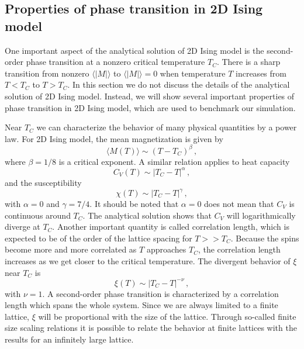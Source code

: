 \subsection{Properties of phase transition in 2D Ising model}\label{sec:transition}
One important aspect of the analytical solution of 2D Ising model is the second-order phase transition 
at a nonzero critical temperature $T_C$. 
There is a sharp transition from nonzero $\langle|M|\rangle $ to $\langle|M|\rangle=0$ 
when temperature $T$ increases from $T<T_C$ to $T>T_C$. 
In this section we do not discuss the details of the analytical solution of 2D Ising model. 
Instead, we will show several important properties of phase transition in 2D Ising model, 
which are used to benchmark our simulation. 
\par
Near $T_C$ we can characterize the behavior of many physical quantities by a power law.
For 2D Ising model, the mean magnetization is given by
\begin{equation}
\langle M(T) \rangle \sim \left(T-T_C\right)^{\beta}\,,
\end{equation}
where $\beta=1/8$ is a critical exponent. A similar relation applies to heat capacity 
\begin{equation}
C_V(T) \sim \left|T_C-T\right|^{\alpha}\,,
\end{equation}
and the susceptibility
\begin{equation}
\chi(T) \sim \left|T_C-T\right|^{\gamma}\,,
\end{equation}
with $\alpha = 0$ and $\gamma = 7/4$. 
It should be noted that $\alpha=0$ does not mean that $C_V$ is continuous around $T_C$. 
The analytical solution shows that $C_V$ will logarithmically diverge at $T_C$. 
Another important quantity is called correlation length, which is expected
to be of the order of the lattice spacing for $T>> T_C$. Because the spins
become more and more correlated as $T$ approaches $T_C$, the correlation
length increases as we get closer to the critical temperature. The divergent
behavior of $\xi$ near $T_C$ is 
\begin{equation}
\xi(T) \sim \left|T_C-T\right|^{-\nu}\,,
\label{eq:xi}
\end{equation}
with $\nu=1$. 
A second-order phase transition is characterized by a
correlation length which spans the whole system.
Since we are always limited to a finite lattice, $\xi$ will
be proportional with the size of the lattice. 
Through so-called finite size scaling relations
it is possible to relate the behavior at finite lattices with the 
results for an infinitely large lattice.
